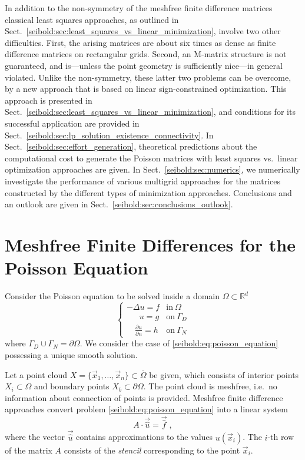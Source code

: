 \documentclass[reqno]{amsart}
\theoremstyle{plain}
\theoremstyle{definition}
\theoremstyle{remark}
\begin{document}
In addition to the non-symmetry of the meshfree finite difference matrices
classical least squares approaches, as outlined in
Sect.~\ref{seibold:sec:least_squares_vs_linear_minimization},
involve two other difficulties.
First, the arising matrices are about six times as dense as finite difference
matrices on rectangular grids.
Second, an M-matrix structure is not guaranteed, and is---unless the point geometry
is sufficiently nice---in general violated.
Unlike the non-symmetry, these latter two problems can be overcome,
by a new approach that is based on linear sign-constrained optimization.
This approach is presented in Sect.~\ref{seibold:sec:least_squares_vs_linear_minimization},
and conditions for its successful application are provided in
Sect.~\ref{seibold:sec:lp_solution_existence_connectivity}.
In Sect.~\ref{seibold:sec:effort_generation}, theoretical predictions about the computational
cost to generate the Poisson matrices with least squares vs.~linear optimization
approaches are given.
In Sect.~\ref{seibold:sec:numerics}, we numerically investigate the performance of
various multigrid approaches for the matrices constructed by the different types of
minimization approaches.
Conclusions and an outlook are given in Sect.~\ref{seibold:sec:conclusions_outlook}.

\section{Meshfree Finite Differences for the Poisson Equation}
\label{seibold:sec:fd_poisson}
Consider the Poisson equation to be solved inside a domain
$\Omega\subset\mathbb{R}^d$
\begin{equation}
\begin{cases}
  -\Delta u = f &\mathrm{in~}\Omega \\
\quad\;\; u = g &\mathrm{on~}\Gamma_D \\
\quad \frac{\partial u}{\partial n} = h &\mathrm{on~}\Gamma_N
\end{cases}
\label{seibold:eq:poisson_equation}
\end{equation}
where $\Gamma_D\cup\Gamma_N=\partial\Omega$. We consider the case
of \eqref{seibold:eq:poisson_equation} possessing a unique smooth solution.

Let a point cloud $X=\{\vec{x}_1,\dots,\vec{x}_n\}\subset\overline{\Omega}$ be given,
which consists of interior points $X_i\subset\Omega$ and boundary points
$X_b\subset\partial\Omega$. The point cloud is meshfree, i.e.~no information about
connection of points is provided. Meshfree finite difference approaches convert
problem \eqref{seibold:eq:poisson_equation} into a linear system
\begin{equation}
A\cdot\vec{\hat u} = \vec{\hat f}\;,
\label{seibold:eq:poisson_system}
\end{equation}
where the vector $\vec{\hat u}$ contains approximations to the values $u(\vec{x}_i)$.
The $i$-th row of the matrix $A$ consists of the \emph{stencil} corresponding to the
point $\vec{x}_i$.
\end{document}
